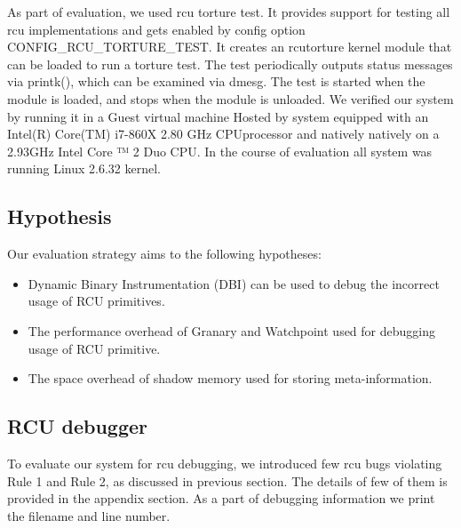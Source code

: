 As part of evaluation, we used rcu torture test. It provides support for testing all rcu implementations and gets enabled by config option CONFIG\_RCU\_TORTURE\_TEST. It creates an rcutorture kernel module that can be loaded to run a torture test.  The test periodically outputs status messages via printk(), which can be examined via dmesg. The test is started when the module is loaded, and stops when the module is unloaded. We veriﬁed our system by running it in a Guest virtual machine Hosted by system equipped with an Intel(R) Core(TM) i7-860X 2.80 GHz CPUprocessor and natively natively on a 2.93GHz Intel Core ™ 2 Duo CPU. In the course of evaluation all system was running Linux 2.6.32 kernel.

\subsection{Hypothesis}
Our evaluation strategy aims to  the following hypotheses:
\begin{itemize}
	\item Dynamic Binary Instrumentation (DBI) can be used to debug the incorrect usage of RCU primitives.
	\item The performance overhead of Granary and Watchpoint used for debugging usage of RCU primitive.
	\item The space overhead of shadow memory used for storing meta-information.
\end{itemize}

\subsection {RCU debugger}
To evaluate our system for rcu debugging, we introduced few rcu bugs violating Rule 1 and Rule 2, as discussed in previous section. The details of few of them is provided in the appendix section. As a part of debugging information we print the filename and line number. 

